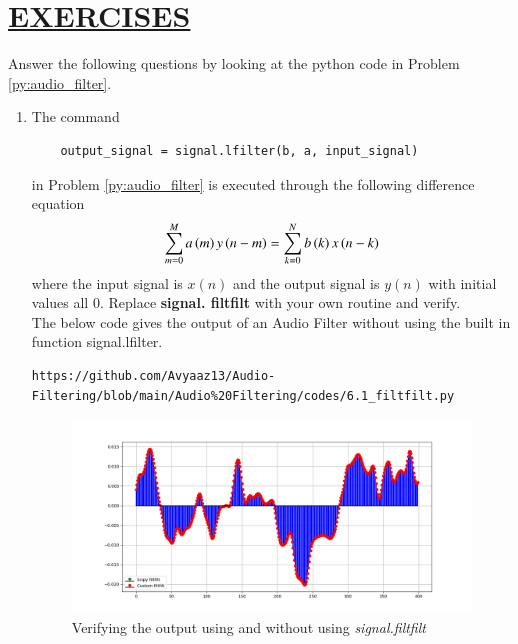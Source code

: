 \documentclass[journal,12pt,twocolumn]{IEEEtran}
\theoremstyle{remark}
\renewcommand\thesection{\arabic{section}}
\numberwithin{equation}{subsection}
\begin{document}
\section{\underline{\textbf{EXERCISES}}}
\noindent Answer the following questions by looking at the python code in Problem \ref{py:audio_filter}.
\begin{enumerate}[label=\thesection.\arabic*]
\item
The command
\begin{lstlisting}
	output_signal = signal.lfilter(b, a, input_signal)
	\end{lstlisting}
in Problem \ref{py:audio_filter} is executed through the following difference equation
\begin{equation}
\label{eq:iir_filter_gen}
 \sum _{m=0}^{M}a\left(m\right)y\left(n-m\right)=\sum _{k=0}^{N}b\left(k\right)x\left(n-k\right) 
\end{equation}
%
where the input signal is $x(n)$ and the output signal is $y(n)$ with initial values all 0. Replace
\textbf{signal. filtfilt} with your own routine and verify.\\

\solution The below code gives the output of an Audio Filter without using the built in function signal.lfilter.

\begin{lstlisting}
https://github.com/Avyaaz13/Audio-Filtering/blob/main/Audio%20Filtering/codes/6.1_filtfilt.py
\end{lstlisting}
\begin{figure}[!ht]
\centering
\includegraphics[width=1.2\columnwidth]{figs/Figure_1.png}
\caption{Verifying the output using and without using {\em signal.filtfilt}}
\label{fig:6.1}
\end{figure}


\end{enumerate}
\end{document}
